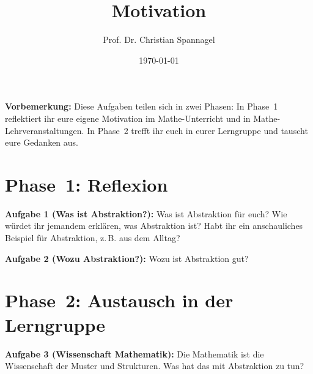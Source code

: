 \documentclass{../cssheet}
\title{Motivation}
\author{Prof. Dr. Christian Spannagel}
\date{\today}
\begin{document}
\printtitle

\textbf{Vorbemerkung:}  Diese Aufgaben teilen sich in zwei Phasen: In Phase~1 reflektiert ihr eure eigene Motivation im Mathe-Unterricht und in Mathe-Lehrveranstaltungen. In Phase~2 trefft ihr euch in eurer Lerngruppe und tauscht eure Gedanken aus.

\section*{Phase~1: Reflexion}

\textbf{Aufgabe 1 (Was ist Abstraktion?):}  Was ist Abstraktion für euch? Wie würdet ihr jemandem erklären, was Abstraktion ist? Habt ihr ein anschauliches Beispiel für Abstraktion, z.\,B. aus dem Alltag?

\textbf{Aufgabe 2 (Wozu Abstraktion?):} Wozu ist Abstraktion gut?


\section*{Phase~2: Austausch in der Lerngruppe}

\textbf{Aufgabe 3 (Wissenschaft Mathematik):} Die Mathematik ist die Wissenschaft der Muster und Strukturen. Was hat das mit Abstraktion zu tun?



\printlicense

\printsocials
\end{document}
